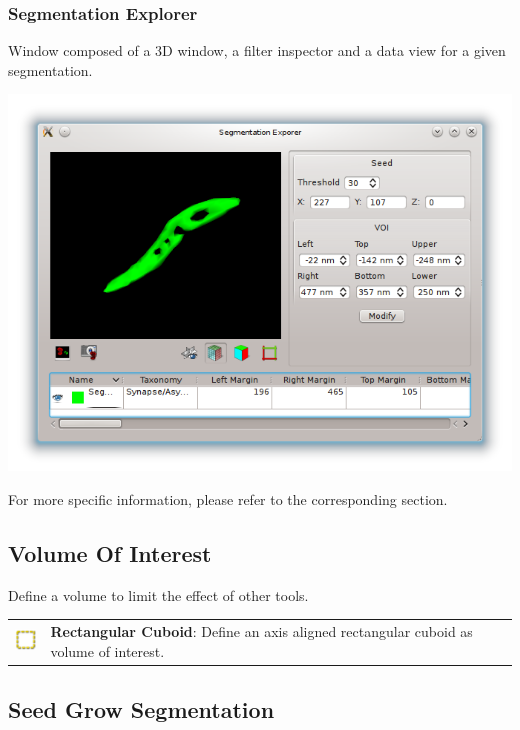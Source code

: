 \subsubsection{Segmentation Explorer}

Window composed of a 3D window, a filter inspector and a data view for a given
segmentation.

\begin{center}
\includegraphics[width=\linewidth]{fig/SegmentationInspector}
\end{center}

For more specific information, please refer to the corresponding section.

\subsection{Volume Of Interest}

Define a volume to limit the effect of other tools.\\

\begin{tabular}{m{0.8cm} m{13cm}}
\includegraphics[width=0.7cm]{../../frontend/toolbar/voi/rsc/roi} &
\textbf{Rectangular Cuboid}: Define an axis aligned rectangular cuboid as volume
of interest.
 \end{tabular}

\subsection{Seed Grow Segmentation}


